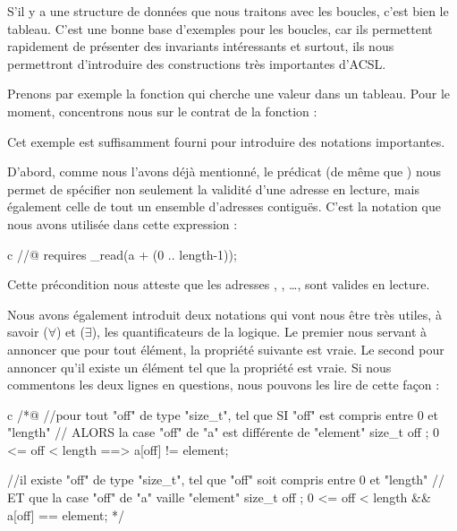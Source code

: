 \label{l3:statements-loops-examples-ro}


S'il y a une structure de données que nous traitons avec les boucles, c'est bien
le tableau. C'est une bonne base d'exemples pour les boucles, car ils permettent
rapidement de présenter des invariants intéressants et surtout, ils nous
permettront d'introduire des constructions très importantes d'ACSL.


Prenons par exemple la fonction qui cherche une valeur dans un tableau. Pour le
moment, concentrons nous sur le contrat de la fonction :




Cet exemple est suffisamment fourni pour introduire des notations importantes.


D'abord, comme nous l'avons déjà mentionné, le prédicat
 (de même que
) nous permet de spécifier non seulement la
validité d'une adresse en lecture, mais également celle de tout un ensemble
d'adresses contiguës. C'est la notation que nous avons utilisée dans cette
expression :


\begin{CodeBlock}{c}
//@ requires \valid_read(a + (0 .. length-1));
\end{CodeBlock}


Cette précondition nous atteste que les adresses ,
, \ldots{},  sont valides en lecture.


Nous avons également introduit deux notations qui vont nous être très utiles, à
savoir  ($\forall$) et  ($\exists$), les
quantificateurs de la logique. Le premier nous servant à annoncer que pour tout
élément, la propriété suivante est vraie. Le second pour annoncer qu'il existe
un élément tel que la propriété est vraie. Si nous commentons les deux lignes en
questions, nous pouvons les lire de cette façon :


\begin{CodeBlock}{c}
/*@
//pour tout "off" de type "size_t", tel que SI "off" est compris entre 0 et "length"
//                                 ALORS la case "off" de "a" est différente de "element"
\forall size_t off ; 0 <= off < length ==> a[off] != element;

//il existe "off" de type "size_t", tel que "off" soit compris entre 0 et "length"
//                                 ET que la case "off" de "a" vaille "element"
\exists size_t off ; 0 <= off < length && a[off] == element;
*/
\end{CodeBlock}


